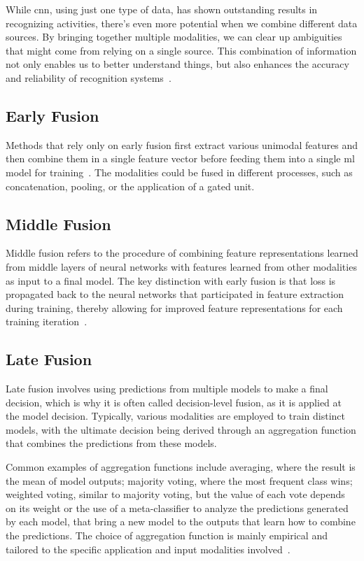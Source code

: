 While \acs{cnn}, using just one type of data, has shown outstanding results in recognizing activities, there's even more potential when we combine different data sources. By bringing together multiple modalities, we can clear up ambiguities that might come from relying on a single source. This combination of information not only enables us to better understand things, but also enhances the accuracy and reliability of recognition systems~\cite{gadzicki_early_2020}.

\subsection{Early Fusion}

Methods that rely only on early fusion first extract various unimodal features and then combine them in a single feature vector before feeding them into a single \ac{ml} model for training~\cite{huang_fusion_2020}.
The modalities could be fused in different processes, such as concatenation, pooling, or the application of a gated unit.

\subsection{Middle Fusion}
Middle fusion refers to the procedure of combining feature representations learned from middle layers of neural networks with features learned from other modalities as input to a final model. The key distinction with early fusion is that loss is propagated back to the neural networks that participated in feature extraction during training, thereby allowing for improved feature representations for each training iteration~\cite{gadzicki_early_2020}. 


\subsection{Late Fusion}

Late fusion involves using predictions from multiple models to make a final decision, which is why it is often called decision-level fusion, as it is applied at the model decision. Typically, various modalities are employed to train distinct models, with the ultimate decision being derived through an aggregation function that combines the predictions from these models.

Common examples of aggregation functions include averaging, where the result is the mean of model outputs; majority voting, where the most frequent class wins; weighted voting, similar to majority voting, but the value of each vote depends on its weight or the use of a meta-classifier to analyze the predictions generated by each model, that bring a new model to the outputs that learn how to combine the predictions. The choice of aggregation function is mainly empirical and tailored to the specific application and input modalities involved~\cite{gadzicki_early_2020}.

